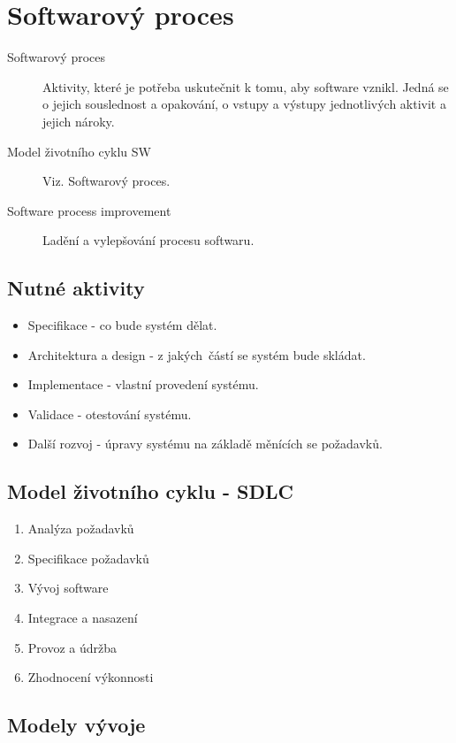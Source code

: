 \section{Softwarový proces}
  \begin{description}
    \item[Softwarový proces] Aktivity, které je potřeba uskutečnit k tomu, aby software vznikl.
    Jedná se o jejich souslednost a opakování, o vstupy a výstupy jednotlivých aktivit a jejich nároky.
    \item[Model životního cyklu SW] Viz. Softwarový proces.
    \item[Software process improvement] Ladění a vylepšování procesu softwaru.
  \end{description}

  \subsection{Nutné aktivity}
  \begin{itemize}
    \item Specifikace - co bude systém dělat.
    \item Architektura a design - z jakých částí se systém bude skládat.
    \item Implementace - vlastní provedení systému.
    \item Validace - otestování systému.
    \item Další rozvoj - úpravy systému na základě měnících se požadavků.
  \end{itemize}

  \subsection{Model životního cyklu - SDLC}
    \begin{enumerate}
      \item Analýza požadavků
      \item Specifikace požadavků
      \item Vývoj software
      \item Integrace a nasazení
      \item Provoz a údržba
      \item Zhodnocení výkonnosti
    \end{enumerate}


  \subsection{Modely vývoje}

